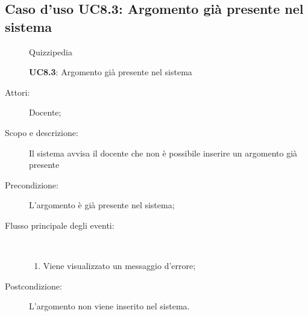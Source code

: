 \subsection{Caso d'uso UC8.3: Argomento già presente nel sistema}
	\begin{figure}[H]
		\centering
		\begin{resizedtikzpicture}{\textwidth}
		\begin{umlsystem}[x=0, fill=lightgray!20]{Quizzipedia}
		\end{umlsystem}
		\end{resizedtikzpicture}
		\caption{\textbf{UC8.3}: Argomento già presente nel sistema}
		\label{UC8.3}
	\end{figure}
\begin{description}
\item[Attori:] Docente;
\item[Scopo e descrizione:] Il sistema avvisa il docente che non è possibile inserire un argomento già presente
      \item[Precondizione:] L'argomento è già presente nel sistema;

        \item[Flusso principale degli eventi:] \ 
 \begin{enumerate}
          \item Viene visualizzato un messaggio d'errore;

      \end{enumerate}
    \item[Postcondizione:] L'argomento non viene inserito nel sistema.
  \end{description}
\hypertarget{UC8.4}{}
